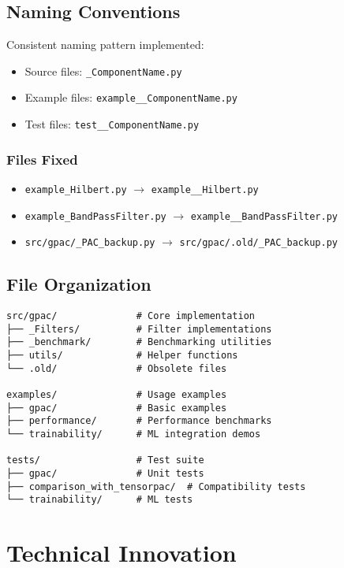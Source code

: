 \documentclass[11pt,a4paper]{article}
\begin{document}
\subsection{Naming Conventions}

Consistent naming pattern implemented:
\begin{itemize}
\item Source files: \texttt{\_ComponentName.py}
\item Example files: \texttt{example\_\_ComponentName.py}
\item Test files: \texttt{test\_\_ComponentName.py}
\end{itemize}

\subsubsection{Files Fixed}
\begin{itemize}
\item \texttt{example\_Hilbert.py} $\rightarrow$ \texttt{example\_\_Hilbert.py}
\item \texttt{example\_BandPassFilter.py} $\rightarrow$ \texttt{example\_\_BandPassFilter.py}
\item \texttt{src/gpac/\_PAC\_backup.py} $\rightarrow$ \texttt{src/gpac/.old/\_PAC\_backup.py}
\end{itemize}

\subsection{File Organization}

\begin{verbatim}
src/gpac/              # Core implementation
├── _Filters/          # Filter implementations
├── _benchmark/        # Benchmarking utilities
├── utils/             # Helper functions
└── .old/              # Obsolete files

examples/              # Usage examples
├── gpac/              # Basic examples
├── performance/       # Performance benchmarks
└── trainability/      # ML integration demos

tests/                 # Test suite
├── gpac/              # Unit tests
├── comparison_with_tensorpac/  # Compatibility tests
└── trainability/      # ML tests
\end{verbatim}

\section{Technical Innovation}
\end{document}
